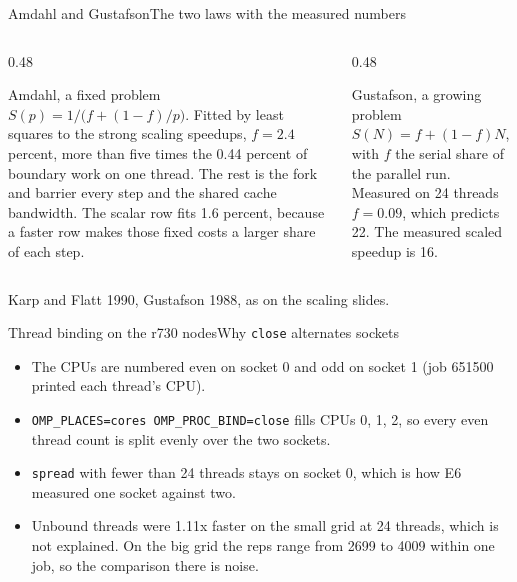\documentclass[aspectratio=169,11pt]{beamer}
\newcommand{\amdahlPercent}{2.4}
\newcommand{\weakScaled}{16}
\newcommand{\gustafsonF}{0.09}
\newcommand{\gustafsonPredicted}{22}
\newcommand{\sigcite}[1]{\par\begin{minipage}{0.74\linewidth}\tiny\color{gray}#1\end{minipage}\par}
\begin{document}
\begin{frame}{Amdahl and Gustafson}{The two laws with the measured numbers}
  \begin{columns}[T,onlytextwidth]
    \begin{column}{0.48\textwidth}
      \begin{block}{Amdahl, a fixed problem}
        \small $S(p) = 1 / \big(f + (1 - f)/p\big)$. Fitted by least
        squares to the strong scaling speedups, $f = \amdahlPercent$ percent,
        more than five times the 0.44 percent of boundary work on one
        thread. The rest is the fork and barrier every step and the shared
        cache bandwidth. The scalar row fits 1.6 percent, because a faster
        row makes those fixed costs a larger share of each step.
      \end{block}
    \end{column}
    \begin{column}{0.48\textwidth}
      \begin{block}{Gustafson, a growing problem}
        \small $S(N) = f + (1 - f) N$, with $f$ the serial share of the
        parallel run. Measured on 24 threads $f = \gustafsonF$, which
        predicts \gustafsonPredicted. The measured scaled speedup is
        \weakScaled.
      \end{block}
    \end{column}
  \end{columns}
  \sigcite{Karp and Flatt 1990, Gustafson 1988, as on the scaling slides.}
\end{frame}

\begin{frame}{Thread binding on the r730 nodes}{Why \texttt{close} alternates sockets}
  {\small
  \begin{itemize}
    \item The CPUs are numbered even on socket 0 and odd on socket 1 (job 651500 printed each thread's CPU).
    \item \texttt{OMP\_PLACES=cores OMP\_PROC\_BIND=close} fills CPUs 0, 1, 2, so every even thread count is split evenly over the two sockets.
    \item \texttt{spread} with fewer than 24 threads stays on socket 0, which is how E6 measured one socket against two.
    \item Unbound threads were 1.11x faster on the small grid at 24 threads, which is not explained. On the big grid the reps range from 2699 to 4009 within one job, so the comparison there is noise.
  \end{itemize}}
\end{frame}
\end{document}
